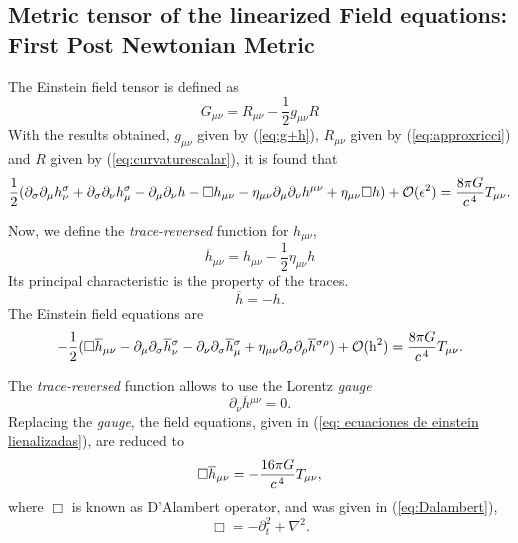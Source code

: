 \subsection{Metric tensor of the linearized Field equations: First Post Newtonian Metric}

The Einstein field tensor is defined as
\begin{equation}
	G_{\mu \nu} = R_{\mu \nu} - \frac{1}{2}g_{\mu \nu}R 
\end{equation}
With the results obtained, $g_{\mu \nu}$ given by (\ref{eq:g+h}), $R_{\mu \nu}$ given by (\ref{eq:approxricci}) and $R$ given by (\ref{eq:curvaturescalar}), it is found that
\begin{equation}
	\frac{1}{2}(\partial_{\sigma}\partial_{\mu}h_{\nu}^{\sigma}+\partial_{\sigma}\partial_{\nu}h_{\mu}^{\sigma}-\partial_{\mu}\partial_{\nu}h - \Box h_{\mu \nu} - \eta_{\mu \nu} \partial_{\mu}\partial_{\nu}h^{\mu \nu}  + \eta_{\mu \nu}\Box h )   + \mathcal{O}(\epsilon ^2) = \frac{8\pi G}{c^{\hspace{0.05cm}4}} T_{\mu \nu}.
\end{equation}

Now, we define the \textit{trace-reversed} function for $h_{\mu \nu}$,
\begin{equation}
  \overline{h}_{\mu \nu} = h_{\mu \nu} - \frac{1}{2}\eta_{\mu \nu}h
  \label{eq:tracedreversed}
\end{equation}
Its principal characteristic is the property of the traces.
\begin{equation}
 	\overline{h} = -h.
\end{equation}
The Einstein field equations are
\begin{equation}
\label{eq: ecuaciones de einstein lienalizadas}
	-\frac{1}{2}( \Box \overline{h}_{\mu \nu} - \partial_{\mu}\partial_{\sigma}\overline{h}{}_{\nu}^{\sigma}- \partial_{\nu}\partial_{\sigma}\overline{h}{}_{\mu}^{\sigma}+\eta_{\mu \nu} \partial_{\sigma}\partial_{\rho}\overline{h}{}^{\sigma \rho}) + \mathcal{O}(\text{h} ^2) = \frac{8\pi G}{c^{\hspace{0.05cm}4}} T_{\mu \nu}.
\end{equation}

The \textit{trace-reversed} function allows to use the Lorentz \textit{gauge}
\begin{equation}
  \partial_\nu \overline{h}{}^{\mu \nu} = 0.
\end{equation}
Replacing the \textit{gauge}, the field equations, given in (\ref{eq: ecuaciones de einstein lienalizadas}), are reduced to
\begin{equation}
	 \Box \overline{h}_{\mu \nu} = - \frac{16\pi G}{c^{\hspace{0.05cm}4}} T_{\mu \nu},
\end{equation}
where $\Box$ is known as D'Alambert operator, and was given in (\ref{eq:Dalambert}),
\begin{equation}
 \Box  = -\partial_t^2 + \nabla^2.
\end{equation}

